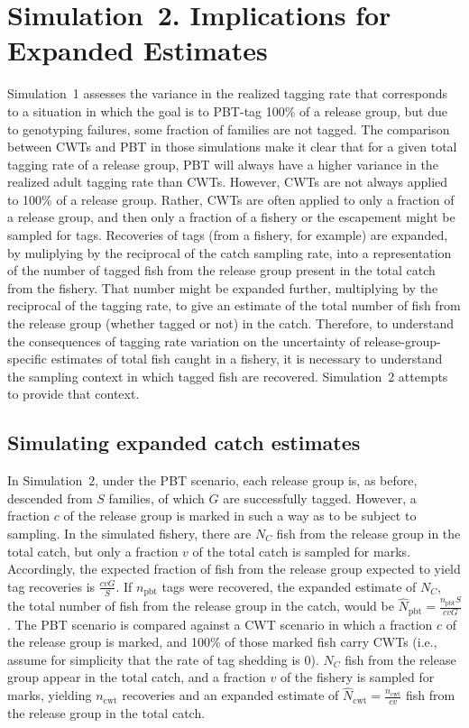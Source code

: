 \documentclass[11pt]{article}
\begin{document}
\section{Simulation~2. Implications for Expanded Estimates}

Simulation~1 assesses the variance in the realized tagging rate that corresponds to a situation in which
the goal is to PBT-tag 100\% of a release group, but due to genotyping failures, some fraction
of families are not tagged.  The comparison between CWTs and PBT in those simulations
make it clear that for a given total tagging rate of a release group, PBT will always have a higher
variance in the realized adult tagging rate than CWTs.  However, CWTs are not always applied to
100\% of a release group.  Rather, CWTs are often applied to only a fraction of a release group, and then
only a fraction of a fishery or the escapement might be sampled for tags.
Recoveries of tags (from a fishery, for example) are expanded, by muliplying by the reciprocal of the
catch sampling rate, into a representation of the number of tagged fish from the release group present in the
total catch from the fishery.  That number might be expanded further, multiplying by the reciprocal of the
tagging rate, to give an estimate of the total number of fish from the release group (whether
tagged or not) in the catch.  Therefore, to understand the consequences of tagging rate
variation on the uncertainty of release-group-specific estimates of total fish caught in a fishery, it is necessary to understand the 
sampling context in which tagged fish are recovered. Simulation~2 attempts to provide that context.  

\subsection{Simulating expanded catch estimates}

In Simulation~2, under the PBT scenario, each release group is, as before, descended from $S$ families, of which $G$ are successfully tagged.  However, a fraction
$c$ of the release group is marked in such a way as to be subject to sampling.  In the simulated fishery, there are $N_C$ fish from
the release group in the total catch, but only a fraction $v$ of the total catch is sampled for marks.  Accordingly, the expected fraction of fish 
from the release group expected to yield tag recoveries is $\frac{cvG}{S}$.   If $n_\mathrm{pbt}$ tags were recovered,
the expanded estimate of $N_C$, the
total number of fish from the release group in the catch, would be $\hat{N}_\mathrm{pbt} = \frac{n_\mathrm{pbt}S}{cvG}$.
The PBT scenario is compared against a CWT scenario in which a fraction $c$ of the release group is marked, and 100\% of those marked fish
carry CWTs (i.e., assume for simplicity that the rate of tag shedding is 0).  $N_C$ fish from the release group appear in the total catch,
and a fraction $v$ of the fishery is sampled for marks, yielding $n_\mathrm{cwt}$ recoveries and an expanded estimate of
$\hat{N}_\mathrm{cwt} = \frac{n_\mathrm{cwt}}{cv}$ fish from the release group in the total catch.  
\end{document}
